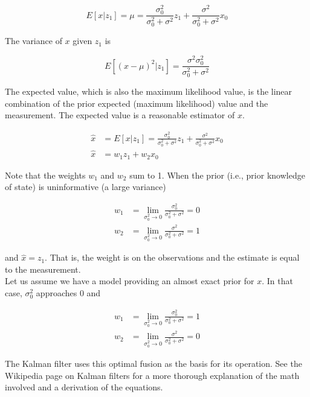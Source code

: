 \begin{equation}
  E[x|z_1] = \mu = \frac{\sigma_0^2}{\sigma_0^2 + \sigma^2}z_1 +
    \frac{\sigma^2}{\sigma_0^2 + \sigma^2}x_0
\end{equation}

The variance of $x$ given $z_1$ is

\begin{equation}
  E[(x - \mu)^2|z_1] = \frac{\sigma^2 \sigma_0^2}{\sigma_0^2 + \sigma^2}
\end{equation}

The expected value, which is also the maximum likelihood value, is the linear
combination of the prior expected (maximum likelihood) value and the
measurement. The expected value is a reasonable estimator of $x$.

\begin{align}
  \hat{x} &= E[x|z_1] = \frac{\sigma_0^2}{\sigma_0^2 + \sigma^2}z_1 +
    \frac{\sigma^2}{\sigma_0^2 + \sigma^2}x_0 \\
  \hat{x} &= w_1 z_1 + w_2 x_0 \nonumber
\end{align}

Note that the weights $w_1$ and $w_2$ sum to 1. When the prior (i.e., prior
knowledge of state) is uninformative (a large variance)

\begin{align}
  w_1 &= \lim_{\sigma_0^2 \to 0} \frac{\sigma_0^2}{\sigma_0^2 + \sigma^2} = 0 \\
  w_2 &= \lim_{\sigma_0^2 \to 0} \frac{\sigma^2}{\sigma_0^2 + \sigma^2} = 1
\end{align}

and $\hat{x} = z_1$. That is, the weight is on the observations and the estimate
is equal to the measurement. \\

Let us assume we have a \gls{model} providing an almost exact prior for $x$. In
that case, $\sigma_0^2$ approaches 0 and

\begin{align}
  w_1 &= \lim_{\sigma_0^2 \to 0} \frac{\sigma_0^2}{\sigma_0^2 + \sigma^2} = 1 \\
  w_2 &= \lim_{\sigma_0^2 \to 0} \frac{\sigma^2}{\sigma_0^2 + \sigma^2} = 0
\end{align}

The Kalman filter uses this optimal fusion as the basis for its operation. See
the Wikipedia page on Kalman filters \cite{bib:kalman_filter} for a more
thorough explanation of the math involved and a derivation of the equations.

